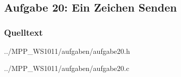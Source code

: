 \subsection*{Aufgabe 20: Ein Zeichen Senden}

\subsubsection*{Quelltext}

{../MPP_WS1011/aufgaben/aufgabe20.h}


{../MPP_WS1011/aufgaben/aufgabe20.c}
